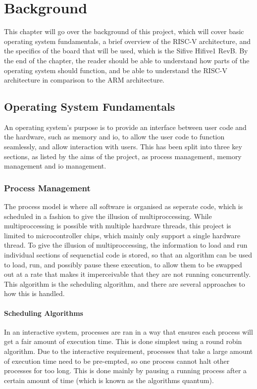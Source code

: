 \chapter[Background]{Background}
\label{cha:backgr}
This chapter will go over the background of this project, which will cover basic operating system fundamentals, a brief overview of the RISC-V architecture, and the specifics of the board that will be used, which is the Sifive Hifive1 RevB. By the end of the chapter, the reader should be able to understand how parts of the operating system should function, and be able to understand the RISC-V architecture in comparison to the ARM architecture.
\section{Operating System Fundamentals}
An operating system's purpose is to provide an interface between user code and the hardware, such as memory and \ac{io}, to allow the user code to function seamlessly, and allow interaction with users. This has been split into three key sections, as listed by the aims of the project, as process management, memory management and \ac{io} management.\cite{modern_operating}
\subsection{Process Management}
The process model is where all software is organised as seperate code, which is scheduled in a fashion to give the illusion of multiproccessing. While multiproccessing is possible with multiple hardware threads, this project is limited to microcontroller chips, which mainly only support a single hardware thread. To give the illusion of multiproccessing, the information to load and run individual sections of sequenctial code is stored, so that an algorithm can be used to load, run, and possibly pause these execution, to allow them to be swapped out at a rate that makes it imperceivable that they are not running concurrently. This algorithm is the scheduling algorithm, and there are several approaches to how this is handled.\cite{modern_operating}
\subsubsection{Scheduling Algorithms}
In an interactive system, processes are ran in a way that ensures each process will get a fair amount of execution time. This is done simplest using a round robin algorithm. Due to the interactive requirement, processes that take a large amount of execution time need to be pre-empted, so one process cannot halt other processes for too long. This is done mainly by pausing a running process after a certain amount of time (which is known as the algorithms quantum).
